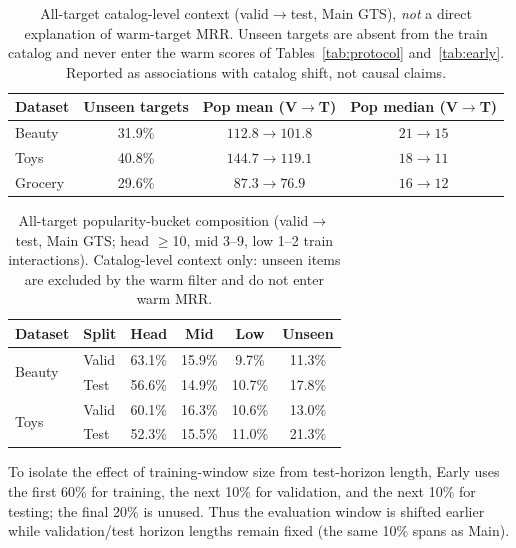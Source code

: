 \documentclass[sigconf,natbib=true,anonymous]{acmart}
\begin{document}
\begin{table}[t]
\centering
\caption{%
All-target catalog-level context (valid$\to$test, Main GTS), \emph{not} a direct explanation of warm-target MRR.
Unseen targets are absent from the train catalog and never enter the warm scores of Tables~\ref{tab:protocol} and~\ref{tab:early}.
Reported as associations with catalog shift, not causal claims.%
}
\label{tab:shift}
\small
\setlength{\tabcolsep}{4pt}
\begin{tabular}{@{}lccc@{}}
\toprule
Dataset & Unseen targets & Pop mean (V$\to$T) & Pop median (V$\to$T) \\
\midrule
Beauty  & 31.9\% & $112.8 \to 101.8$ & $21 \to 15$ \\
Toys    & 40.8\% & $144.7 \to 119.1$ & $18 \to 11$ \\
Grocery & 29.6\% & $87.3 \to 76.9$ & $16 \to 12$ \\
\bottomrule
\end{tabular}
\end{table}

\begin{table}[t]
\centering
\caption{%
All-target popularity-bucket composition (valid$\to$test, Main GTS; head $\ge$10, mid 3--9, low 1--2 train interactions).
Catalog-level context only: unseen items are excluded by the warm filter and do not enter warm MRR.%
}
\label{tab:bucket}
\small
\setlength{\tabcolsep}{3.5pt}
\begin{tabular}{@{}llcccc@{}}
\toprule
Dataset & Split & Head & Mid & Low & Unseen \\
\midrule
\multirow{2}{*}{Beauty}
 & Valid & 63.1\% & 15.9\% & 9.7\% & 11.3\% \\
 & Test  & 56.6\% & 14.9\% & 10.7\% & 17.8\% \\
\midrule
\multirow{2}{*}{Toys}
 & Valid & 60.1\% & 16.3\% & 10.6\% & 13.0\% \\
 & Test  & 52.3\% & 15.5\% & 11.0\% & 21.3\% \\
\bottomrule
\end{tabular}
\end{table}

To isolate the effect of training-window size from test-horizon length, Early uses the first 60\% for training, the next 10\% for validation, and the next 10\% for testing; the final 20\% is unused.
Thus the evaluation window is shifted earlier while validation/test horizon lengths remain fixed (the same 10\% spans as Main).
\end{document}
